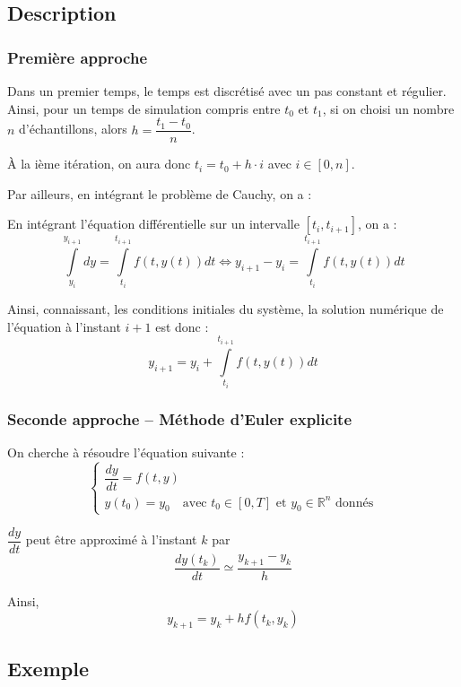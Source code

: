 \documentclass[10pt]{article}
\begin{document}
\subsection{Description}

\subsubsection{Première approche}
Dans un premier temps, le temps est discrétisé avec un pas constant et régulier. Ainsi, pour un temps de simulation compris entre $t_0$ et $t_1$, si on choisi un nombre $n$ d'échantillons, alors  $h=\dfrac{t_1-t_0}{n}$.

 À la ième itération, on aura donc $t_i = t_0+h\cdot i$ avec $i\in[0,n]$.
 
Par ailleurs, en intégrant le problème de Cauchy, on a : 

En intégrant l'équation différentielle sur un intervalle $[t_i, t_{i+1}]$, on a : 
$$
\int\limits_{y_i}^{y_{i+1}} dy = \int\limits_{t_i}^{t_{i+1}} f(t,y(t)) dt 
\Longleftrightarrow 
y_{i+1} - y_i = \int\limits_{t_i}^{t_{i+1}} f(t,y(t)) dt 
$$

\begin{resultat}
Ainsi, connaissant, les conditions initiales du système, la solution numérique de l'équation à l'instant $i+1$ est donc : 
$$
y_{i+1}= y_i + \int\limits_{t_i}^{t_{i+1}} f(t,y(t)) dt 
$$
\end{resultat}

\subsubsection{Seconde approche -- Méthode d'Euler explicite}
On cherche à résoudre l'équation suivante :
$$
\left\{
\begin{array}{l}
\dfrac{dy}{dt}=f(t,y) \\
y(t_0)=y_0 \quad \text{avec } t_0\in [0,T] \text{ et } y_0\in \mathbb{R}^n \text{ donnés}
\end{array}
\right.
 $$ 

$\dfrac{dy}{dt}$ peut être approximé à l'instant $k$ par 
$$
\dfrac{dy(t_k)}{dt} \simeq \dfrac{y_{k+1}-y_k}{h}
$$

Ainsi,
$$
y_{k+1} = y_k +h  f(t_k,y_k)
$$

\subsection{Exemple}
%
%
%
%
\end{document}
